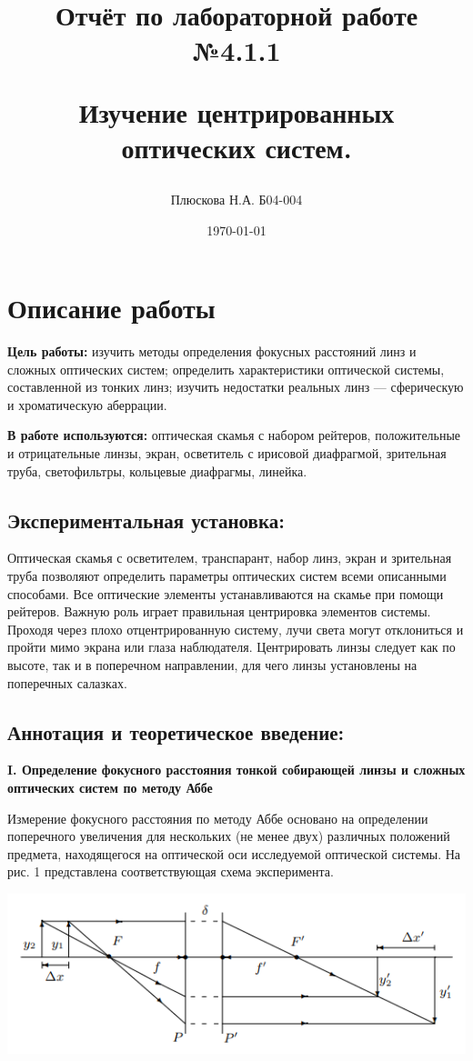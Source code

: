 \documentclass[a4paper,12pt]{report}
\title{Отчёт по лабораторной работе №4.1.1 

Изучение центрированных оптических систем.}
\author{Плюскова Н.А. Б04-004 }
\date{\today}
\begin{document}
\maketitle

\section*{\huge{Описание работы}}
\noindent\textbf{Цель работы:} изучить методы определения фокусных расстояний
линз и сложных оптических систем; определить характеристики оптической системы, составленной из тонких линз; изучить недостатки
реальных линз — сферическую и хроматическую аберрации.

\noindent\textbf{В работе используются:} оптическая скамья с набором рейтеров, положительные и отрицательные линзы, экран, осветитель с ирисовой
диафрагмой, зрительная труба, светофильтры, кольцевые диафрагмы, линейка.

\subsection*{Экспериментальная установка:} 

Оптическая скамья с осветителем,
транспарант, набор линз, экран и зрительная труба позволяют определить параметры оптических систем всеми описанными способами. Все
оптические элементы устанавливаются на скамье при помощи рейтеров.
Важную роль играет правильная центрировка элементов системы.
Проходя через плохо отцентрированную систему, лучи света могут отклониться и пройти мимо экрана или глаза наблюдателя. Центрировать
линзы следует как по высоте, так и в поперечном направлении, для чего
линзы установлены на поперечных салазках.

\subsection*{Аннотация и теоретическое введение:}

\noindent\textbf{I. Определение фокусного расстояния тонкой собирающей линзы
и сложных оптических систем по методу Аббе}

Измерение фокусного расстояния по методу Аббе основано на определении поперечного увеличения для нескольких (не менее двух) различных положений предмета, находящегося на оптической оси исследуемой оптической системы. На рис. 1 представлена соответствующая схема эксперимента.
\begin{center}
    \includegraphics[scale = 1.2]{pic1.PNG}
\end{center}
\end{document}
